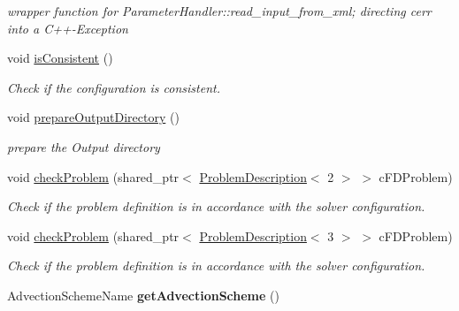 \begin{DoxyCompactItemize}
\begin{DoxyCompactList}\small\item\em wrapper function for Parameter\-Handler\-::read\-\_\-input\-\_\-from\-\_\-xml; directing cerr into a C++-\/\-Exception \end{DoxyCompactList}\item 
\hypertarget{classnatrium_1_1SolverConfiguration_a90f8fb87f504897d3bbbc746749d2967}{void \hyperlink{classnatrium_1_1SolverConfiguration_a90f8fb87f504897d3bbbc746749d2967}{is\-Consistent} ()}\label{classnatrium_1_1SolverConfiguration_a90f8fb87f504897d3bbbc746749d2967}

\begin{DoxyCompactList}\small\item\em Check if the configuration is consistent. \end{DoxyCompactList}\item 
void \hyperlink{classnatrium_1_1SolverConfiguration_a69c009fd87690677b66ab10a000d07f6}{prepare\-Output\-Directory} ()
\begin{DoxyCompactList}\small\item\em prepare the Output directory \end{DoxyCompactList}\item 
void \hyperlink{classnatrium_1_1SolverConfiguration_a49e6c9cd57689289c79b47a6104b483a}{check\-Problem} (shared\-\_\-ptr$<$ \hyperlink{classnatrium_1_1ProblemDescription}{Problem\-Description}$<$ 2 $>$ $>$ c\-F\-D\-Problem)
\begin{DoxyCompactList}\small\item\em Check if the problem definition is in accordance with the solver configuration. \end{DoxyCompactList}\item 
void \hyperlink{classnatrium_1_1SolverConfiguration_af13da3022a9f995ce09b0918092da0c9}{check\-Problem} (shared\-\_\-ptr$<$ \hyperlink{classnatrium_1_1ProblemDescription}{Problem\-Description}$<$ 3 $>$ $>$ c\-F\-D\-Problem)
\begin{DoxyCompactList}\small\item\em Check if the problem definition is in accordance with the solver configuration. \end{DoxyCompactList}\item 
\hypertarget{classnatrium_1_1SolverConfiguration_aaf32180358f99d78d56b3435dff11a11}{Advection\-Scheme\-Name {\bfseries get\-Advection\-Scheme} ()}\label{classnatrium_1_1SolverConfiguration_aaf32180358f99d78d56b3435dff11a11}


\end{DoxyCompactItemize}
